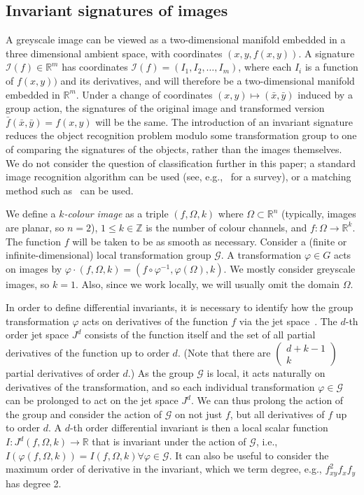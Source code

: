 \documentclass{artjlt}
\def\R{\mathbb{R}}
\begin{document}
\subsection{Invariant signatures of images}

A greyscale image can be viewed as a two-dimensional manifold embedded in a three dimensional ambient space, with coordinates $(x, y, f(x,y))$. A signature $\mathcal{I}(f) \in \mathbb{R}^m$ has coordinates $\mathcal{I}(f) = (I_1, I_2, \ldots, I_m)$, where each $I_i$ is a function of $f(x, y))$ and its derivatives, and will therefore be a two-dimensional manifold embedded in $\mathbb{R}^m$. Under a change of coordinates $(x, y) \mapsto (\bar{x}, \bar{y})$ induced by a group action, the signatures of the original image and transformed version $\bar{f}(\bar{x}, \bar{y}) = f(x, y)$ will be the same. The introduction of an invariant signature reduces the object recognition problem modulo some transformation group to one of comparing the signatures of the objects, rather than the images themselves. We do not consider the question of classification further in this paper; a standard image recognition algorithm can be used (see, e.g.,~\citet{Zhang20} for a survey), or a matching method such as~\citet{UsCurrents} can be used.

We define a {\em $k$-colour image} as a triple $(f,\Omega,k)$ where $\Omega\subset\R^n$ (typically, images are planar, so $n=2$), $1\le k\in\mathbb{Z}$ is the number of colour channels, and $f\colon\Omega\to\R^k$. The function $f$ will be taken to be as smooth as necessary. Consider a (finite or infinite-dimensional) local transformation group $\mathcal{G}$.  A transformation $\varphi\in G$ acts on images by $\varphi\cdot (f,\Omega,k) = (f\circ\varphi^{-1},\varphi(\Omega),k)$. We mostly consider greyscale images, so $k=1$. Also, since we work locally, we will usually omit the domain $\Omega$.

In order to define differential invariants, it is necessary to identify how the group transformation $\varphi$ acts on derivatives of the function $f$ via the jet space~\citep{Kruglikov2011,OlverEIS}. The $d$-th order jet space $J^d$ consists of the function itself and the set of all partial derivatives of the function up to order $d$. (Note that there are $\left( \begin{array}{c} d+k-1 \\ k \end{array} \right)$ partial derivatives of order $d$.) As the group $\mathcal{G}$ is local, it acts naturally on derivatives of the transformation, and so each individual transformation $\varphi \in \mathcal{G}$ can be prolonged to act on the jet space $J^d$. We can thus prolong the action of the group and consider the action of $\mathcal{G}$ on not just $f$, but all derivatives of $f$ up to order $d$. A $d$-th order differential invariant is then a local scalar function $I: J^{d} (f,\Omega, k) \to \mathbb{R}$ that is invariant under the action of $\mathcal{G}$, i.e., $I(\varphi(f,\Omega, k)) = I(f, \Omega, k) \forall \varphi \in \mathcal{G}$. It can also be useful to consider the maximum order of derivative in the invariant, which we term degree, e.g., $f_{xy}^2 f_x f_y$ has degree 2. 
\end{document}
